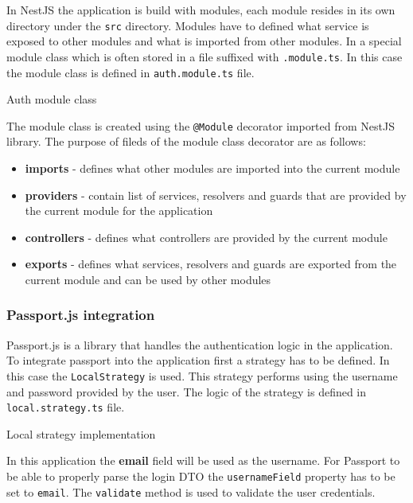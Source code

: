 \documentclass[../main.tex]{subfiles}
\begin{document}
In NestJS the application is build with modules, each module resides in its own directory under the \texttt{src} directory.
Modules have to defined what service is exposed to other modules and what is imported from other modules. In a special module class
which is often stored in a file suffixed with \texttt{.module.ts}. In this case the module class is defined in \texttt{auth.module.ts} file.

\begin{listing}[H]
  \caption{Auth module class}
  \label{lst:auth-module}
\end{listing}

The module class is created using the \texttt{@Module} decorator imported from NestJS library.
The purpose of fileds of the module class decorator are as follows:
\begin{itemize}
  \item \textbf{imports} - defines what other modules are imported into the current module
  \item \textbf{providers} - contain list of services, resolvers and guards that are provided by the current module for the application
  \item \textbf{controllers} - defines what controllers are provided by the current module
  \item \textbf{exports} - defines what services, resolvers and guards are exported from the current module and can be used by other modules
\end{itemize}

\subsubsection{Passport.js integration}

Passport.js is a library that handles the authentication logic in the application.
To integrate passport into the application first a strategy has to be defined. In this case the \texttt{LocalStrategy} is used.
This strategy performs using the username and password provided by the user. The logic of the strategy is defined in \texttt{local.strategy.ts} file.

\begin{listing}[H]
  \caption{Local strategy implementation}
\end{listing}

In this application the \textbf{email} field will be used as the username. For Passport to be able to properly parse the login DTO the
\texttt{usernameField} property has to be set to \texttt{email}. The \texttt{validate} method is used to validate the user credentials.
\end{document}
